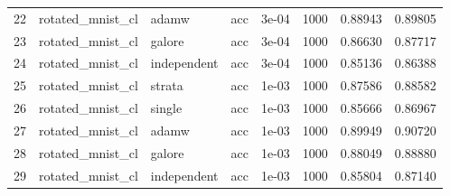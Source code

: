 \begin{longtable}{rlllrrrr}
22 & rotated\_mnist\_cl & adamw & acc & 3e-04 & 1000 & 0.88943 & 0.89805 \\
23 & rotated\_mnist\_cl & galore & acc & 3e-04 & 1000 & 0.86630 & 0.87717 \\
24 & rotated\_mnist\_cl & independent & acc & 3e-04 & 1000 & 0.85136 & 0.86388 \\
\rowcolor{oursbg}
25 & rotated\_mnist\_cl & strata & acc & 1e-03 & 1000 & 0.87586 & 0.88582 \\
26 & rotated\_mnist\_cl & single & acc & 1e-03 & 1000 & 0.85666 & 0.86967 \\
27 & rotated\_mnist\_cl & adamw & acc & 1e-03 & 1000 & 0.89949 & 0.90720 \\
28 & rotated\_mnist\_cl & galore & acc & 1e-03 & 1000 & 0.88049 & 0.88880 \\
29 & rotated\_mnist\_cl & independent & acc & 1e-03 & 1000 & 0.85804 & 0.87140 \\
\bottomrule\end{longtable}
